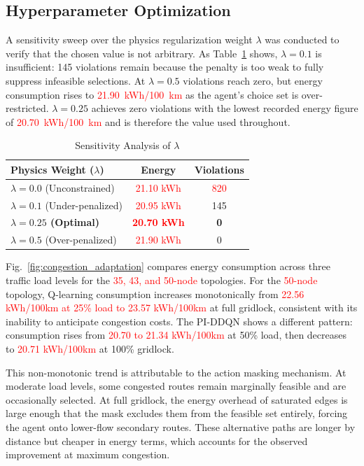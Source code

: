 \documentclass[conference]{IEEEtran}
\begin{document}
\subsection{Hyperparameter Optimization}
A sensitivity sweep over the physics regularization weight $\lambda$ was conducted to verify that the chosen value is not arbitrary. As Table~\ref{tab:sensitivity_analysis} shows, $\lambda = 0.1$ is insufficient: 145 violations remain because the penalty is too weak to fully suppress infeasible selections. At $\lambda = 0.5$ violations reach zero, but energy consumption rises to \textcolor{red}{21.90~kWh/100~km} as the agent's choice set is over-restricted. $\lambda = 0.25$ achieves zero violations with the lowest recorded energy figure of \textcolor{red}{20.70~kWh/100~km} and is therefore the value used throughout.

\begin{table}[htbp]
\centering
\caption{Sensitivity Analysis of $\lambda$}
\label{tab:sensitivity_analysis}
\renewcommand{\arraystretch}{1.15}
\setlength{\tabcolsep}{8pt}
\small
\begin{tabular}{|l|c|c|}
\hline
\textbf{Physics Weight ($\lambda$)} & \textbf{Energy} & \textbf{Violations} \\ \hline
$\lambda=0.0$ (Unconstrained) & \textcolor{red}{21.10 kWh} & \textcolor{red}{820} \\ \hline
$\lambda=0.1$ (Under-penalized) & \textcolor{red}{20.95 kWh} & 145 \\ \hline
\textbf{$\lambda=0.25$ (Optimal)} & \textbf{\textcolor{red}{20.70 kWh}} & \textbf{0} \\ \hline
$\lambda=0.5$ (Over-penalized) & \textcolor{red}{21.90 kWh} & 0 \\ \hline
\end{tabular}
\end{table}

Fig.~\ref{fig:congestion_adaptation} compares energy consumption across three traffic load levels for the \textcolor{red}{35, 43, and 50-node} topologies. For the \textcolor{red}{50-node} topology, Q-learning consumption increases monotonically from \textcolor{red}{22.56 kWh/100km at 25\% load to 23.57 kWh/100km} at full gridlock, consistent with its inability to anticipate congestion costs. The PI-DDQN shows a different pattern: consumption rises from \textcolor{red}{20.70 to 21.34 kWh/100km} at 50\% load, then decreases to \textcolor{red}{20.71 kWh/100km} at 100\% gridlock.

This non-monotonic trend is attributable to the action masking mechanism. At moderate load levels, some congested routes remain marginally feasible and are occasionally selected. At full gridlock, the energy overhead of saturated edges is large enough that the mask excludes them from the feasible set entirely, forcing the agent onto lower-flow secondary routes. These alternative paths are longer by distance but cheaper in energy terms, which accounts for the observed improvement at maximum congestion.
\end{document}
